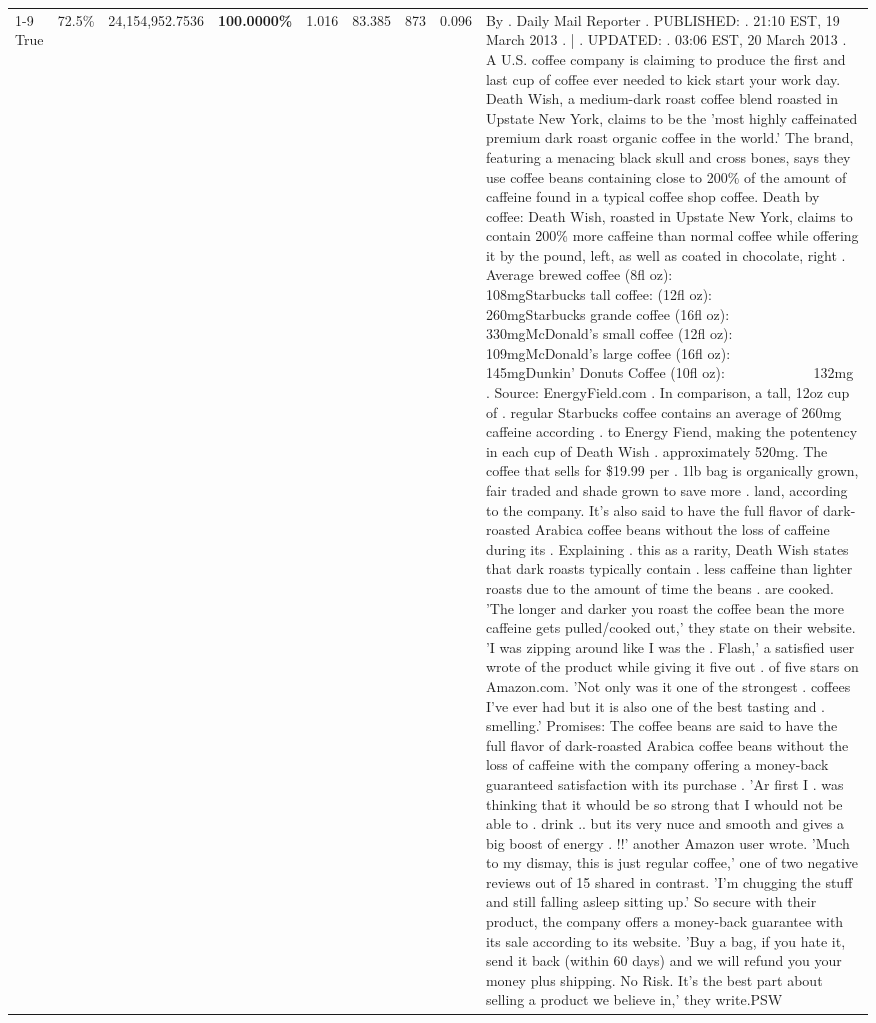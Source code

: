 \begin{table}[H]
{\begin{tabular}{lllrlllll}
\cline{1-9} \cline{2-9}
True & 72.5\% & 24,154,952.7536 & \bfseries \color{red} 100.0000\% & 1.016 & 83.385 & 873 & 0.096 & By . Daily Mail Reporter . PUBLISHED: . 21:10 EST, 19 March 2013 . | . UPDATED: . 03:06 EST, 20 March 2013 . A U.S. coffee company is claiming to produce the first and last cup of coffee ever needed to kick start your work day. Death Wish, a medium-dark roast coffee blend roasted in Upstate New York, claims to be the 'most highly caffeinated premium dark roast organic coffee in the world.' The brand, featuring a menacing black skull and cross bones, says they use coffee beans containing close to 200\% of the amount of caffeine found in a typical coffee shop coffee. Death by coffee: Death Wish, roasted in Upstate New York, claims to contain 200\% more caffeine than normal coffee while offering it by the pound, left, as well as coated in chocolate, right . Average brewed coffee (8fl oz):              108mgStarbucks tall coffee: (12fl oz):                260mgStarbucks grande coffee (16fl oz):         330mgMcDonald's small coffee (12fl oz):           109mgMcDonald's large coffee (16fl oz):           145mgDunkin' Donuts Coffee (10fl oz):             132mg . Source: EnergyField.com . In comparison, a tall, 12oz cup of . regular Starbucks coffee contains an average of 260mg caffeine according . to Energy Fiend, making the potentency in each cup of Death Wish . approximately 520mg. The coffee that sells for \$19.99 per . 1lb bag is organically grown, fair traded and shade grown to save more . land, according to the company. It's also said to have the full flavor of dark-roasted Arabica coffee beans without the loss of caffeine during its . Explaining . this as a rarity, Death Wish states that dark roasts typically contain . less caffeine than lighter roasts due to the amount of time the beans . are cooked. 'The longer and darker you roast the coffee bean the more caffeine gets pulled/cooked out,' they state on their website. 'I was zipping around like I was the . Flash,' a satisfied user wrote of the product while giving it five out . of five stars on Amazon.com. 'Not only was it one of the strongest . coffees I've ever had but it is also one of the best tasting and . smelling.’ Promises: The coffee beans are said to have the full flavor of dark-roasted Arabica coffee beans without the loss of caffeine with the company offering a money-back guaranteed satisfaction with its purchase . 'Ar first I . was thinking that it whould be so strong that I whould not be able to . drink .. but its very nuce and smooth and gives a big boost of energy . !!' another Amazon user wrote. 'Much to my dismay, this is just regular coffee,' one of two negative reviews out of 15 shared in contrast. 'I'm chugging the stuff and still falling asleep sitting up.' So secure with their product, the company offers a money-back guarantee with its sale according to its website. 'Buy a bag, if you hate it, send it back (within 60 days) and we will refund you your money plus shipping. No Risk. It’s the best part about selling a product we believe in,' they write.PSW \\

\end{tabular}}
\end{table}
